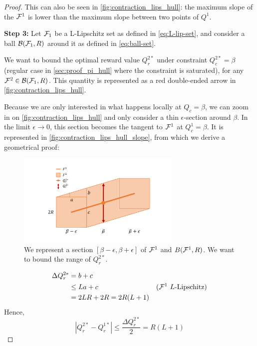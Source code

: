 \begin{proof}
This can also be seen in \autoref{fig:contraction_lips_hull}: the maximum slope of the $\mathcal{F}^1$ is lower than the maximum slope between two points of $Q^1$.

\textbf{Step 3:} Let $\mathcal{F}_1$ be a L-Lipschitz set as defined in \eqref{eq:L-lip-set}, and consider a ball $\mathcal{B}(\mathcal{F}_1,R)$ around it as defined in \eqref{eq:ball-set}.

We want to bound the optimal reward value $Q_r^{2*}$ under constraint $Q_c^{2*} = \beta$ (regular case in \autoref{sec:proof_pi_hull} where the constraint is saturated), for any $\mathcal{F}^2\in\mathcal{B}(\mathcal{F}_1,R)$. This quantity is represented as a red double-ended arrow in \autoref{fig:contraction_lips_hull}.

Because we are only interested in what happens locally at $Q_c=\beta$, we can zoom in on \autoref{fig:contraction_lips_hull} and only consider a thin $\epsilon$-section around $\beta$. In the limit $\epsilon\rightarrow 0$, this section becomes the tangent to $\mathcal{F}^1$ at $Q_c^1=\beta$. It is represented in \autoref{fig:contraction_lips_hull_slope}, from which we derive a geometrical proof:
\begin{figure}[ht]
    \centering
    \includegraphics[trim=2cm 1cm 2cm 1cm, clip, width=0.7\textwidth]{2-Chapters/5-Chapter/img/contraction_lipschitz_slope.pdf}
    \caption{We represent a section $[\beta-\epsilon, \beta+\epsilon]$ of $\mathcal{F}^1$ and $B(\mathcal{F}^1, R)$. We want to bound the range of $Q_r^{2*}.$}
    \label{fig:contraction_lips_hull_slope}
\end{figure}

\begin{align*}
    \Delta Q_r^{2*} &= b + c &\\
    & \leq La + c & \text{($\mathcal{F}^1$ $L$-Lipschitz)}\\
    &= 2LR+2R = 2R(L+1)
\end{align*}
Hence,
\begin{equation*}
    | Q_r^{2*} - Q_r^{1*}| \leq \frac{\Delta Q_r^{2*}}{2} = R(L+1)
\end{equation*}


\end{proof}
